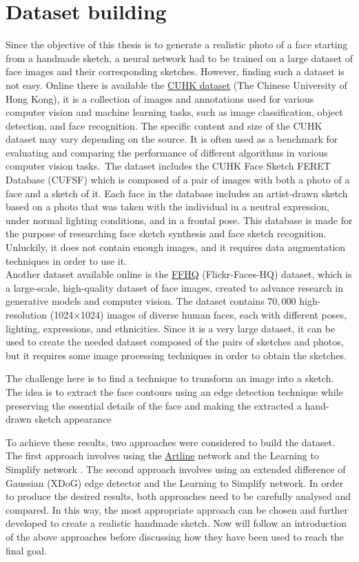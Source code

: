 \newpage
\section{Dataset building}
\label{section:datasetChapter}
Since the objective of this thesis is to generate a realistic photo of a face starting from a handmade sketch, a neural network had to be trained on a large dataset of face images and their corresponding sketches. However, finding such a dataset is not easy. Online there is available the \href{http://mmlab.ie.cuhk.edu.hk/archive/facesketch.html}{CUHK dataset} (The Chinese University of Hong Kong), it is a collection of images and annotations used for various computer vision and machine learning tasks, such as image classification, object detection, and face recognition. The specific content and size of the CUHK dataset may vary depending on the source. It is often used as a benchmark for evaluating and comparing the performance of different algorithms in various computer vision tasks. The dataset includes the CUHK Face Sketch FERET Database (CUFSF) which is composed of a pair of images with both a photo of a face and a sketch of it. Each face in the database includes an artist-drawn sketch based on a photo that was taken with the individual in a neutral expression, under normal lighting conditions, and in a frontal pose. This database is made for the purpose of researching face sketch synthesis and face sketch recognition. Unluckily, it does not contain enough images, and it requires data augmentation techniques in order to use it.  \\
Another dataset available online is the \href{https://github.com/NVlabs/ffhq-dataset}{FFHQ} (Flickr-Faces-HQ) dataset, which is a large-scale, high-quality dataset of face images, created to advance research in generative models and computer vision. The dataset contains $70,000$ high-resolution (1024×1024) images of diverse human faces, each with different poses, lighting, expressions, and ethnicities. Since it is a very large dataset, it can be used to create the needed dataset composed of the pairs of sketches and photos, but it requires some image processing techniques in order to obtain the sketches.

\noindent The challenge here is to find a technique to transform an image into a sketch. The idea is to extract the face contours using an edge detection technique while preserving the essential details of the face and making the extracted  a hand-drawn sketch appearance

\noindent To achieve these results, two approaches were considered to build the dataset. The first approach involves using the \href{https://github.com/vijishmadhavan/ArtLine}{Artline} network and the Learning to Simplify network \cite{SketchSimplify}. The second approach involves using an extended difference of Gaussian (XDoG) edge detector \cite{xdog} and the Learning to Simplify network.
In order to produce the desired results, both approaches need to be carefully analysed and compared. In this way, the most appropriate approach can be chosen and further developed to create a realistic handmade sketch. 
Now will follow an introduction of the above approaches before discussing how they have been used to reach the final goal.

